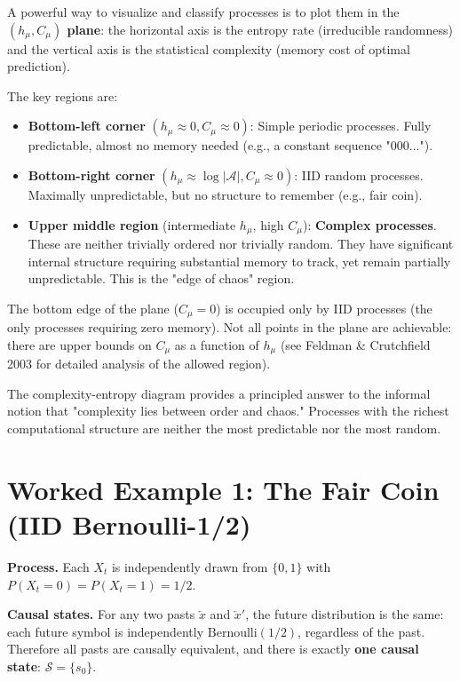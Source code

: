 A powerful way to visualize and classify processes is to plot them in the \textbf{$(h_\mu, C_\mu)$ plane}: the horizontal axis is the entropy rate (irreducible randomness) and the vertical axis is the statistical complexity (memory cost of optimal prediction).

The key regions are:

\begin{itemize}
\item \textbf{Bottom-left corner} $(h_\mu \approx 0, C_\mu \approx 0)$: Simple periodic processes. Fully predictable, almost no memory needed (e.g., a constant sequence "000...").
\item \textbf{Bottom-right corner} $(h_\mu \approx \log |\mathcal{A}|, C_\mu \approx 0)$: IID random processes. Maximally unpredictable, but no structure to remember (e.g., fair coin).
\item \textbf{Upper middle region} (intermediate $h_\mu$, high $C_\mu$): \textbf{Complex processes}. These are neither trivially ordered nor trivially random. They have significant internal structure requiring substantial memory to track, yet remain partially unpredictable. This is the "edge of chaos" region.
\end{itemize}

The bottom edge of the plane ($C_\mu = 0$) is occupied only by IID processes (the only processes requiring zero memory). Not all points in the plane are achievable: there are upper bounds on $C_\mu$ as a function of $h_\mu$ (see Feldman \& Crutchfield 2003 for detailed analysis of the allowed region).

The complexity-entropy diagram provides a principled answer to the informal notion that "complexity lies between order and chaos." Processes with the richest computational structure are neither the most predictable nor the most random.



\section{Worked Example 1: The Fair Coin (IID Bernoulli-1/2)}

\textbf{Process.} Each $X_t$ is independently drawn from $\{ 0, 1\} $ with $P(X_t = 0) = P(X_t = 1) = 1/2$.

\textbf{Causal states.} For any two pasts $\overleftarrow{x}$ and $\overleftarrow{x}'$, the future distribution is the same: each future symbol is independently $\text{Bernoulli}(1/2)$, regardless of the past. Therefore all pasts are causally equivalent, and there is exactly \textbf{one causal state}: $\mathcal{S} = \{ s_0\} $.

